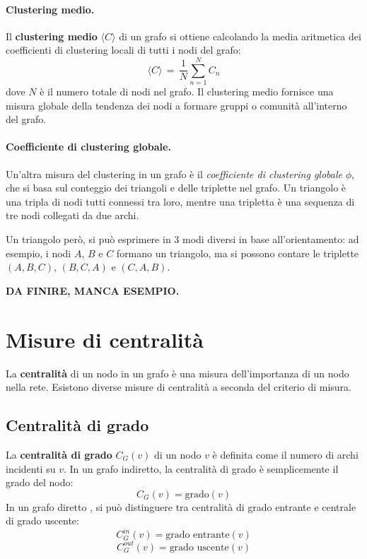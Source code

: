 \paragraph{Clustering medio.}
Il \textbf{clustering medio} $\langle C \rangle$ di un grafo si ottiene calcolando la media aritmetica dei coefficienti di clustering locali di tutti i nodi del grafo:
\[
\langle C \rangle \,=\, \frac{1}{N} \sum_{n=1}^{N} C_n
\]
dove $N$ è il numero totale di nodi nel grafo. Il clustering medio fornisce una misura globale della tendenza dei nodi a formare gruppi o comunità all'interno del grafo.

\paragraph{Coefficiente di clustering globale.} Un'altra misura del clustering in un grafo è il \emph{coefficiente di clustering globale} $\phi$, che si basa sul conteggio dei triangoli e delle triplette nel grafo. Un triangolo è una tripla di nodi tutti connessi tra loro, mentre una tripletta è una sequenza di tre nodi collegati da due archi. 

Un triangolo però, si può esprimere in 3 modi diversi in base all'orientamento: ad esempio, i nodi \(A\), \(B\) e \(C\) formano un triangolo, ma si possono contare le triplette \( (A, B, C) \), \( (B, C, A) \) e \( (C, A, B) \). 



\textbf{DA FINIRE, MANCA ESEMPIO.}

\section{Misure di centralità}
La \textbf{centralità} di un nodo in un grafo è una misura dell'importanza di un nodo nella rete. Esistono diverse misure di centralità a seconda del criterio di misura.

\subsection{Centralità di grado}
La \textbf{centralità di grado} \( C_G(v) \) di un nodo \( v \) è definita come il numero di archi incidenti su \( v \). In un grafo indiretto, la centralità di grado è semplicemente il grado del nodo:
\[C_G(v) = \text{grado}(v) \]
In un grafo diretto , si può distinguere tra centralità di grado entrante e centrale di grado uscente:
\[C_G^{in}(v) = \text{grado entrante}(v) \]
\[C_G^{out}(v) = \text{grado uscente}(v) \] 

